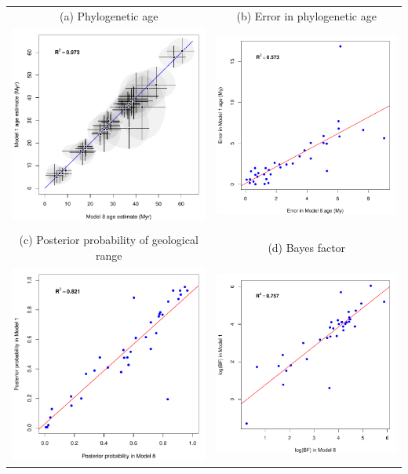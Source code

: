 \documentclass{standalone}
\begin{document}
\begin{tabular}{cc}
(a) Phylogenetic age & (b) Error in phylogenetic age \\
\includegraphics[width=6.5cm]{compareAgeM1M8.pdf} 
& 
\includegraphics[width=6.5cm]{compareErrorM1M8.pdf} \\
\\
(c) Posterior probability of geological range & (d) Bayes factor \\
\includegraphics[width=6.5cm]{comparePostM1M8.pdf} 
&
\includegraphics[width=6.5cm]{compareBFM1M8.pdf}
\\
\end{tabular}
\end{document}
